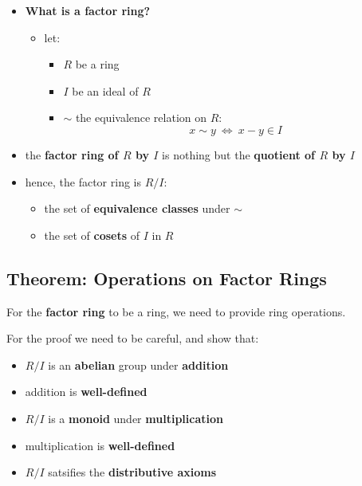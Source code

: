 \documentclass{exam}
\begin{document}
\begin{itemize}
    \item \textbf{What is a factor ring?}
    \begin{itemize}
        \item let:
        \begin{itemize}
            \item $R$ be a ring
            \item $I$ be an ideal of $R$
            \item $\sim$ the equivalence relation on $R$:
            \[
            x \sim y \ \iff \ x - y \in I
            \]
        \end{itemize}
    \end{itemize}
    \item the \textbf{factor ring of $R$ by $I$} is nothing but the \textbf{quotient of $R$ by $I$}
    \item hence, the factor ring is $R / I$:
    \begin{itemize}
        \item the set of \textbf{equivalence classes} under $\sim$
        \item the set of \textbf{cosets} of $I$ in $R$
    \end{itemize}
\end{itemize}

\subsection{Theorem: Operations on Factor Rings}

For the \textbf{factor ring} to be a ring, we need to provide ring operations.


For the proof we need to be careful, and show that:
\begin{itemize}
    \item $R/I$ is an \textbf{abelian} group under \textbf{addition}
    \item addition is \textbf{well-defined}
    \item $R/I$ is a \textbf{monoid} under \textbf{multiplication}
    \item multiplication is \textbf{well-defined}
    \item $R/I$ satsifies the \textbf{distributive axioms}
\end{itemize}
\end{document}
